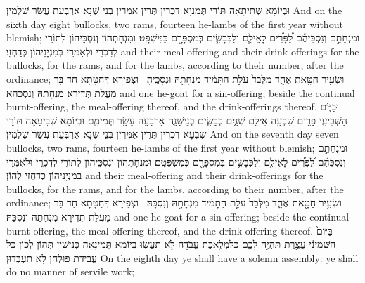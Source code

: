 {וּבְיוֹמָא שְׁתִיתָאָה תּוֹרֵי תְּמָנְיָא דִּכְרִין תְּרֵין אִמְּרִין בְּנֵי שְׁנָא אַרְבְּעַת עֲשַׂר שַׁלְמִין׃}
{And on the sixth day eight bullocks, two rams, fourteen he-lambs of the first year without blemish;}{}
{וּמִנְחָתָ֣ם וְנִסְכֵּיהֶ֡ם לַ֠פָּרִ֠ים לָאֵילִ֧ם וְלַכְּבָשִׂ֛ים בְּמִסְפָּרָ֖ם כַּמִּשְׁפָּֽט׃}
{וּמִנְחָתְהוֹן וְנִסְכֵּיהוֹן לְתוֹרֵי לְדִכְרֵי וּלְאִמְּרֵי בְּמִנְיָנֵיהוֹן כְּדַחְזֵי׃}
{and their meal-offering and their drink-offerings for the bullocks, for the rams, and for the lambs, according to their number, after the ordinance;}{}
{וּשְׂעִ֥יר חַטָּ֖את אֶחָ֑ד מִלְּבַד֙ עֹלַ֣ת הַתָּמִ֔יד מִנְחָתָ֖הּ וּנְסָכֶֽיהָ׃ \setuma }
{וּצְפִירָא דְּחַטָּתָא חַד בָּר מֵעֲלַת תְּדִירָא מִנְחָתַהּ וְנִסְכַּהָא׃}
{and one he-goat for a sin-offering; beside the continual burnt-offering, the meal-offering thereof, and the drink-offerings thereof.}{}
{וּבַיּ֧וֹם הַשְּׁבִיעִ֛י פָּרִ֥ים שִׁבְעָ֖ה אֵילִ֣ם שְׁנָ֑יִם כְּבָשִׂ֧ים בְּנֵי\maqqaf שָׁנָ֛ה אַרְבָּעָ֥ה עָשָׂ֖ר תְּמִימִֽם׃}
{וּבְיוֹמָא שְׁבִיעָאָה תּוֹרֵי שִׁבְעָא דִּכְרִין תְּרֵין אִמְּרִין בְּנֵי שְׁנָא אַרְבְּעַת עֲשַׂר שַׁלְמִין׃}
{And on the seventh day seven bullocks, two rams, fourteen he-lambs of the first year without blemish;}{}
{וּמִנְחָתָ֣ם וְנִסְכֵּהֶ֡ם לַ֠פָּרִ֠ים לָאֵילִ֧ם וְלַכְּבָשִׂ֛ים בְּמִסְפָּרָ֖ם כְּמִשְׁפָּטָֽם׃}
{וּמִנְחָתְהוֹן וְנִסְכֵּיהוֹן לְתוֹרֵי לְדִכְרֵי וּלְאִמְּרֵי בְּמִנְיָנֵיהוֹן כְּדַחְזֵי לְהוֹן׃}
{and their meal-offering and their drink-offerings for the bullocks, for the rams, and for the lambs, according to their number, after the ordinance;}{}
{וּשְׂעִ֥יר חַטָּ֖את אֶחָ֑ד מִלְּבַד֙ עֹלַ֣ת הַתָּמִ֔יד מִנְחָתָ֖הּ וְנִסְכָּֽהּ׃ \setuma }
{וּצְפִירָא דְּחַטָּתָא חַד בַּר מֵעֲלַת תְּדִירָא מִנְחָתַהּ וְנִסְכַּהּ׃}
{and one he-goat for a sin-offering; beside the continual burnt-offering, the meal-offering thereof, and the drink-offering thereof.}{}
{בַּיּוֹם֙ הַשְּׁמִינִ֔י עֲצֶ֖רֶת תִּהְיֶ֣ה לָכֶ֑ם כׇּל\maqqaf מְלֶ֥אכֶת עֲבֹדָ֖ה לֹ֥א תַעֲשֽׂוּ׃}
{בְּיוֹמָא תְּמִינָאָה כְּנִישִׁין תְּהוֹן לְכוֹן כָּל עֲבִידַת פּוּלְחַן לָא תַעְבְּדוּן׃}
{On the eighth day ye shall have a solemn assembly: ye shall do no manner of servile work;}{}
